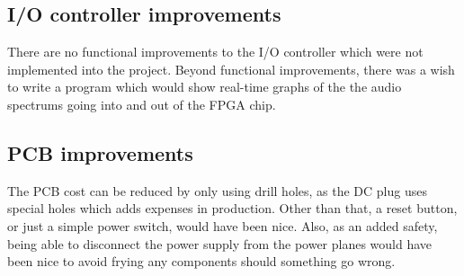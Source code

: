 \subsection{I/O controller improvements}

There are no functional improvements to the I/O controller which were not
implemented into the project. Beyond functional improvements, there was a
wish to write a program which would show real-time graphs of the the audio
spectrums going into and out of the FPGA chip.

\subsection{PCB improvements}
The PCB cost can be reduced by only using drill holes, as the DC plug uses
special holes which adds expenses in production.  Other than that, a reset
button, or just a simple power switch, would have been nice. Also, as an added
safety, being able to disconnect the power supply from the power planes would
have been nice to avoid frying any components should something go wrong.

